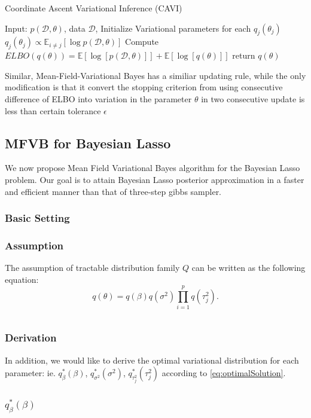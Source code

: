 \begin{algorithm}
	\caption{Coordinate Ascent Variational Inference (CAVI)}
	\begin{algorithmic}[1]
		
		\State Input: $p(\mathcal{D},\theta)$, data $\mathcal{D}$, Initialize Variational parameters for each $q_j(\theta_j)$
		\State $q_j(\theta_j) \propto \mathbb{E}_{i\neq j}[\log p(\mathcal{D},\theta)]$
		\EndFor
		\State Compute $ELBO(q(\theta)) = \mathbb{E}[\log[p(\mathcal{D},\theta)]] + \mathbb{E}[\log[q(\theta)]]$
		\EndWhile 
		\State return $q(\theta)$
		
		
		
	\end{algorithmic}
\end{algorithm}
Similar, Mean-Field-Variational Bayes has a similiar updating rule, while the only modification is that it convert the stopping criterion from using consecutive difference of ELBO into variation in the parameter $\theta$ in two consecutive update is less than certain tolerance $\epsilon$

\newpage
\subsection{MFVB for Bayesian Lasso}
We now propose Mean Field Variational Bayes algorithm for the Bayesian Lasso problem. Our goal is to attain Bayesian Lasso posterior approximation in a faster and efficient manner than that of three-step gibbs sampler.
\subsubsection{Basic Setting}

\subsubsection{Assumption}
The assumption of tractable distribution family $Q$ can be written as the following equation:
\begin{equation}
	q(\theta) = q(\beta)q(\sigma^2)\prod_{i=1}^p q(\tau_j^2).
\end{equation}

$$$$
\subsubsection{Derivation}
In addition, we would like to derive the optimal variational distribution for each parameter: ie. $q_{\beta}^*(\beta)$, $q_{\sigma^2}^*(\sigma^2)$, $q_{\tau_j^2}^*(\tau_j^2)$ according to \autoref{eq:optimalSolution}.\\
\subsubsection{$q_{\beta}^*(\beta)$}





